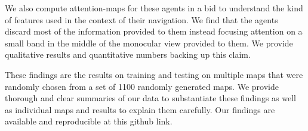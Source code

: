 We also compute attention-maps for these agents in a bid to understand the kind of features used in the context of their navigation. We find that the agents discard most of the information provided to them instead focusing attention on a small band in the middle of the monocular view provided to them. We provide qualitative results and quantitative numbers backing up this claim.

These findings are the results on training and testing on multiple maps that were randomly chosen from a set of 1100 randomly generated maps. We provide thorough and clear summaries of our data to substantiate these findings as well as individual maps and results to explain them carefully. Our findings are available and reproducible at this github link.
